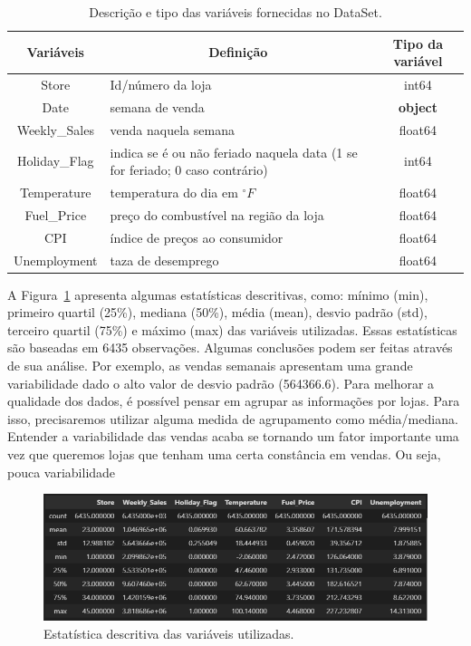 \documentclass[letterpaper,11pt]{article}
\begin{document}
\begin{table}[!htb]

\begin{center}
\caption{Descrição e tipo das variáveis fornecidas no DataSet.}

\label{table1} 
\begin{tabular}{clc} %
\hline
\multicolumn{1}{c}{Variáveis } & \multicolumn{1}{c}{Definição} & Tipo da variável \\
\hline
Store &  Id/número da loja&  int64  \\
Date & semana de venda &  \textbf{object}  \\
Weekly\_Sales& venda naquela semana &  float64  \\
Holiday\_Flag& indica se é ou não feriado naquela data (1 se for feriado; 0 caso contrário) & int64  \\
Temperature& temperatura do dia em $^{\circ} F$ &  float64  \\
Fuel\_Price&   preço do combustível na região da loja  & float64\\
CPI&   índice de preços ao consumidor  & float64\\
Unemployment& taza de desemprego &  float64  \\

\hline
\end{tabular}
\end{center}
\end{table}

A Figura~\ref{fig1} apresenta algumas estatísticas descritivas, como: mínimo (min), primeiro quartil (25\%), mediana (50\%), média (mean), desvio padrão (std), terceiro quartil (75\%) e máximo (max) das variáveis utilizadas. Essas estatísticas são baseadas em 6435 observações. Algumas conclusões podem ser feitas através de sua análise. Por exemplo, as vendas semanais apresentam uma grande variabilidade dado o alto valor de desvio padrão (564366.6). Para melhorar a qualidade dos dados, é possível pensar em agrupar as informações por lojas. Para isso, precisaremos utilizar alguma medida de agrupamento como média/mediana. Entender a variabilidade das vendas acaba se tornando um fator importante uma vez que queremos lojas que tenham uma certa constância em vendas. Ou seja, pouca variabilidade

\begin{figure}[!htb] 
\caption{\label{fig1}Estatística descritiva das variáveis utilizadas.
        }
        \centering \includegraphics[width=1\columnwidth]{descritiva.png}
        
\end{figure}
\end{document}
